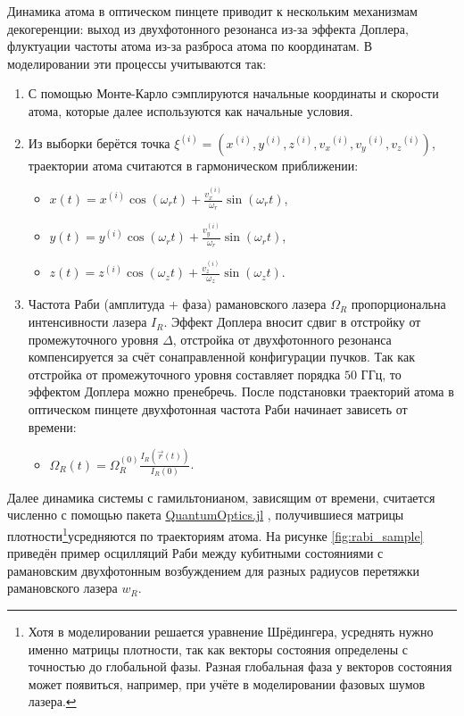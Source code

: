 Динамика атома в оптическом пинцете приводит к нескольким механизмам декогеренции: выход из двухфотонного резонанса из-за эффекта Доплера, флуктуации частоты атома из-за разброса атома по координатам. В моделировании эти процессы учитываются так:

\begin{enumerate}
	\item С помощью Монте-Карло сэмплируются начальные координаты и скорости атома, которые далее используются как начальные условия.

	\item Из выборки берётся точка $\xi^{(i)} = \left(x^{\left(i\right)},y^{\left(i\right)},z^{\left(i\right)},{v_x}^{\left(i\right)},{v_y}^{\left(i\right)},{v_z}^{\left(i\right)}\right)$, траектории атома считаются в гармоническом приближении:

	\begin{itemize}
		\item $x\left(t\right)=x^{\left(i\right)}\cos{\left(\omega_rt\right)}+\frac{v_x^{\left(i\right)}}{\omega_r}\sin{\left(\omega_rt\right)}$,

		\item $y\left(t\right)=y^{\left(i\right)}\cos{\left(\omega_rt\right)}+\frac{v_y^{\left(i\right)}}{\omega_r}\sin{\left(\omega_rt\right)}$,

		\item $z\left(t\right)=z^{\left(i\right)}\cos{\left(\omega_zt\right)}+\frac{v_z^{\left(i\right)}}{\omega_z}\sin{\left(\omega_zt\right)}$.
	\end{itemize}

	\item Частота Раби (амплитуда + фаза) рамановского лазера $\Omega_{R}$ пропорциональна интенсивности лазера $I_{R}$. Эффект Доплера вносит сдвиг в отстройку от промежуточного уровня $\Delta$, отстройка от двухфотонного резонанса компенсируется за счёт сонаправленной конфигурации пучков. Так как отстройка от промежуточного уровня составляет порядка $50 \text{ ГГц}$, то эффектом Доплера можно пренебречь. После подстановки траекторий атома в оптическом пинцете двухфотонная частота Раби начинает зависеть от времени:

	\begin{itemize}
		\item $\Omega_{R}(t) = \Omega_{R}^{(0)} \frac{I_{R}(\vec{r}(t))}{I_{R}(0)}$. 
	\end{itemize}	
\end{enumerate}
	
Далее динамика системы с гамильтонианом, зависящим от времени, считается численно с помощью пакета \href{https://www.qojulia.org/}{QuantumOptics.jl} \cite{kramer2018quantumoptics}, получившиеся матрицы плотности\footnote{Хотя в моделировании решается уравнение Шрёдингера, усреднять нужно именно матрицы плотности, так как векторы состояния определены с точностью до глобальной фазы. Разная глобальная фаза у векторов состояния может появиться, например, при учёте в моделировании фазовых шумов лазера. }усредняются по траекториям атома. На рисунке \ref{fig:rabi_sample} приведён пример осцилляций Раби между кубитными состояниями с рамановским двухфотонным возбуждением для разных радиусов перетяжки рамановского лазера $w_R$. 

